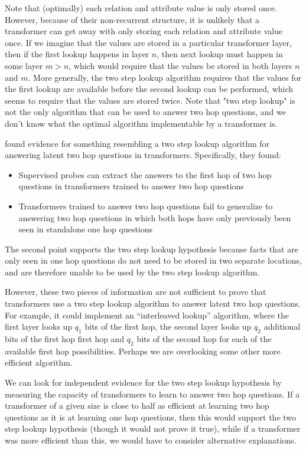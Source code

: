 \documentclass{article}
\theoremstyle{plain}
\theoremstyle{definition}
\theoremstyle{remark}
\begin{document}
Note that (optimally) each relation and attribute value is only stored once. However, because of their non-recurrent structure, it is unlikely that a transformer can get away with only storing each relation and attribute value once. If we imagine that the values are stored in a particular transformer layer, then if the first lookup happens in layer $n$, then next lookup must happen in some layer $m > n$, which would require that the values be stored in both layers $n$ and $m$. More generally, the two step lookup algorithm requires that the values for the first lookup are available before the second lookup can be performed, which seems to require that the values are stored twice. Note that "two step lookup" is not the only algorithm that can be used to answer two hop questions, and we don't know what the optimal algorithm implementable by a transformer is.

\citet{wangGrokkedTransformersAre2024} found evidence for something resembling a two step lookup algorithm for answering latent two hop questions in transformers. Specifically, they found:

\begin{itemize}
    \item Supervised probes can extract the answers to the first hop of two hop questions in transformers trained to answer two hop questions 
    \item Transformers trained to answer two hop questions fail to generalize to answering two hop questions in which both hops have only previously been seen in standalone one hop questions
\end{itemize}

The second point supports the two step lookup hypothesis because facts that are only seen in one hop questions do not need to be stored in two separate locations, and are therefore unable to be used by the two step lookup algorithm.

However, these two pieces of information are not sufficient to prove that transformers use a two step lookup algorithm to answer latent two hop questions. For example, it could implement an ``interleaved lookup'' algorithm, where the first layer looks up $q_1$ bits of the first hop, the second layer looks up $q_2$ additional bits of the first hop first hop and $q_2$ bits of the second hop for each of the available first hop possibilities. Perhaps we are overlooking some other more efficient algorithm.

We can look for independent evidence for the two step lookup hypothesis by measuring the capacity of transformers to learn to answer two hop questions. If a transformer of a given size is close to half as efficient at learning two hop questions as it is at learning one hop questions, then this would support the two step lookup hypothesis (though it would not prove it true), while if a transformer was more efficient than this, we would have to consider alternative explanations.
\end{document}
